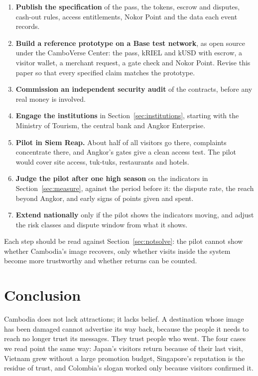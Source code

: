 \documentclass[10pt,letterpaper,twocolumn]{article}
\begin{document}
\begin{enumerate}
  \item \textbf{Publish the specification} of the pass, the tokens, escrow and
  disputes, cash-out rules, access entitlements, Nokor Point and the data each
  event records.
  \item \textbf{Build a reference prototype on a Base test network}, as open
  source under the CamboVerse Center: the pass, kRIEL and kUSD with escrow, a
  visitor wallet, a merchant request, a gate check and Nokor Point. Revise this
  paper so that every specified claim matches the prototype.
  \item \textbf{Commission an independent security audit} of the contracts,
  before any real money is involved.
  \item \textbf{Engage the institutions} in Section~\ref{sec:institutions},
  starting with the Ministry of Tourism, the central bank and Angkor
  Enterprise.
  \item \textbf{Pilot in Siem Reap.} About half of all visitors go there,
  complaints concentrate there, and Angkor's gates give a clean access test.
  The pilot would cover site access, tuk-tuks, restaurants and hotels.
  \item \textbf{Judge the pilot after one high season} on the indicators in
  Section~\ref{sec:measure}, against the period before it: the dispute rate,
  the reach beyond Angkor, and early signs of points given and spent.
  \item \textbf{Extend nationally} only if the pilot shows the indicators
  moving, and adjust the risk classes and dispute window from what it shows.
\end{enumerate}

Each step should be read against Section~\ref{sec:notsolve}: the pilot cannot
show whether Cambodia's image recovers, only whether visits inside the system
become more trustworthy and whether returns can be counted.

\section{Conclusion}
\label{sec:conclusion}

Cambodia does not lack attractions; it lacks belief. A destination whose image
has been damaged cannot advertise its way back, because the people it needs to
reach no longer trust its messages. They trust people who went. The four cases
we read point the same way: Japan's visitors return because of their last
visit, Vietnam grew without a large promotion budget, Singapore's reputation is
the residue of trust, and Colombia's slogan worked only because visitors
confirmed it.
\end{document}
